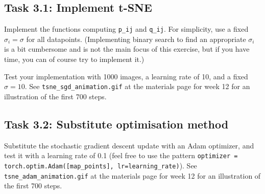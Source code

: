 \documentclass[paper=a4, fontsize=11pt]{article} %
\numberwithin{equation}{section} %
\numberwithin{figure}{section} %
\numberwithin{table}{section} %
\begin{document}
\subsection*{Task 3.1: Implement t-SNE}

\noindent Implement the functions computing \texttt{p\_ij} and \texttt{q\_ij}. For simplicity, use
a fixed $\sigma_i = \sigma$ for all datapoints. (Implementing binary search to find an appropriate
$\sigma_i$ is a bit cumbersome and is not the main focus of this exercise, but if you have time,
you can of course try to implement it.)

Test your implementation with 1000 images, a learning rate of 10, and a fixed $\sigma = 10$. See
\texttt{tsne\_sgd\_animation.gif} at the materials page for week 12 for an illustration of the first
700 steps.

\subsection*{Task 3.2: Substitute optimisation method}

\noindent Substitute the stochastic gradient descent update with an Adam optimizer, and test it
with a learning rate of 0.1 (feel free to use the pattern
\texttt{optimizer = torch.optim.Adam([map\_points], lr=learning\_rate)}). See
\texttt{tsne\_adam\_animation.gif} at the materials page for week 12 for an illustration of the
first 700 steps.

%
%
%
\end{document}
